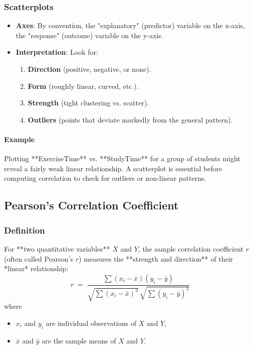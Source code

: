 \documentclass[10pt]{extarticle}
\begin{document}
\subsubsection*{Scatterplots}

\begin{itemize}
    \item \textbf{Axes}: By convention, the "explanatory" (predictor) variable on the x-axis, the "response" (outcome) variable on the y-axis.
    \item \textbf{Interpretation}: Look for:
          \begin{enumerate}
              \item \textbf{Direction} (positive, negative, or none).
              \item \textbf{Form} (roughly linear, curved, etc.).
              \item \textbf{Strength} (tight clustering vs. scatter).
              \item \textbf{Outliers} (points that deviate markedly from the general pattern).
          \end{enumerate}
\end{itemize}

\paragraph{Example} Plotting **ExerciseTime** vs. **StudyTime** for a group of students might reveal a fairly weak linear relationship. A scatterplot is essential before computing correlation to check for outliers or non-linear patterns.


\subsection{Pearson's Correlation Coefficient}

\subsubsection{Definition}

For **two quantitative variables** $X$ and $Y$, the sample correlation coefficient $r$ (often called Pearson's $r$) measures the **strength and direction** of their *linear* relationship:
\[
    r \;=\; \frac{\sum (x_i - \bar{x})(y_i - \bar{y})}
    {\sqrt{\sum (x_i - \bar{x})^2}\,\sqrt{\sum (y_i - \bar{y})^2}}
\]
where
\begin{itemize}
    \item $x_i$ and $y_i$ are individual observations of $X$ and $Y$,
    \item $\bar{x}$ and $\bar{y}$ are the sample means of $X$ and $Y$.
\end{itemize}
\end{document}
